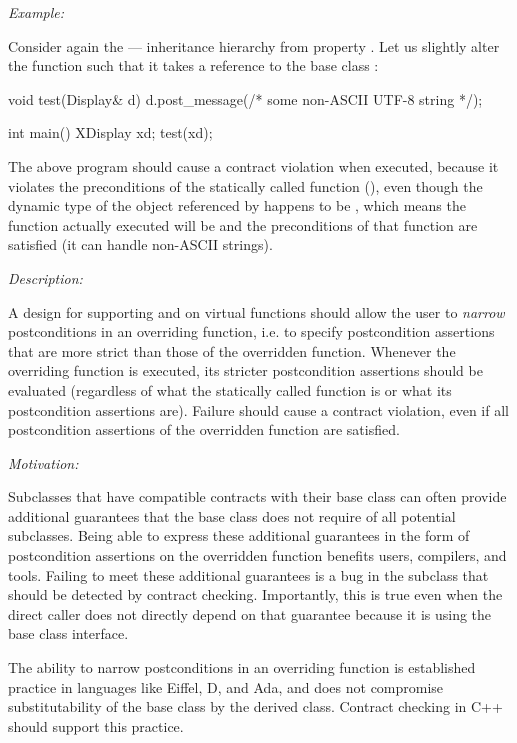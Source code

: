 \emph{Example:}

Consider again the  ---  inheritance hierarchy from property . Let us slightly alter the  function such that it takes a reference to the base class :
\begin{codeblock}
void test(Display& d) {
  d.post_message(/* some non-ASCII UTF-8 string */);
}

int main() {
  XDisplay xd;
  test(xd);
}
\end{codeblock}
The above program should cause a contract violation when executed, because it violates the preconditions of the statically called function (), even though  the dynamic type of the object referenced by  happens to be , which means the function actually executed will be  and the preconditions of that function are satisfied (it can handle non-ASCII strings).


\emph{Description:}

A design for supporting  and  on virtual functions should allow the user to \emph{narrow} postconditions in an overriding function, i.e. to specify postcondition assertions that are more strict than those of the overridden function. Whenever the overriding function is executed, its stricter postcondition assertions should be evaluated (regardless of what the statically called function is or what its postcondition assertions are). Failure should cause a contract violation, even if all postcondition assertions of the overridden function are satisfied.

\emph{Motivation:}

Subclasses that have compatible contracts with their base class can often provide additional guarantees that the base class does not require of all potential subclasses. Being able to express these additional guarantees in the form of postcondition assertions on the overridden function benefits users, compilers, and tools. Failing to meet these additional guarantees is a bug in the subclass that should be detected by contract checking. Importantly, this is true even when the direct caller does not directly depend on that guarantee because it is using the base class interface.

The ability to narrow postconditions in an overriding function is established practice in languages like Eiffel, D, and Ada, and does not compromise substitutability of the base class by the derived class. Contract checking in C++ should support this practice.

